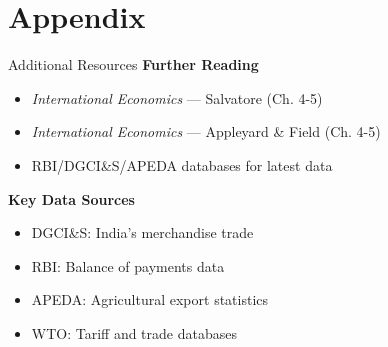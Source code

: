 \documentclass[
  ignorenonframetext,
  aspectratio=169,
]{beamer}
\makeatletter
\providecommand{\tightlist}{%
  \setlength{\itemsep}{0pt}\setlength{\parskip}{0pt}}
\let\quarto@originallabel\label
\DeclareRobustCommand*{\label}[1]{\quarto@originallabel{#1}}
\makeatother
\begin{document}
\section{Appendix}\label{appendix}

\begin{frame}{Additional Resources}
\label{additional-resources}
\textbf{Further Reading}

\begin{itemize}
\tightlist
\item
  \emph{International Economics} --- Salvatore (Ch. 4-5)
\item
  \emph{International Economics} --- Appleyard \& Field (Ch. 4-5)
\item
  RBI/DGCI\&S/APEDA databases for latest data
\end{itemize}

\textbf{Key Data Sources}

\begin{itemize}
\tightlist
\item
  DGCI\&S: India's merchandise trade
\item
  RBI: Balance of payments data\\
\item
  APEDA: Agricultural export statistics
\item
  WTO: Tariff and trade databases
\end{itemize}
\end{frame}
\end{document}
